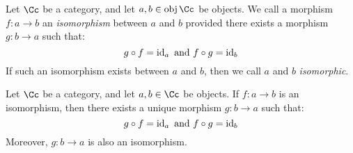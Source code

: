 \begin{definition}
  Let $\Cc$ be a category, and let $a,b \in \obj{\Cc}$ be objects. We
  call a morphism $f:a \xrightarrow{} b$ an \textit{isomorphism}
  between $a$ and $b$ provided there exists a morphism $g:b
  \xrightarrow{} a$ such that:
  \begin{equation*}
    g \circ f=\operatorname{id}_a \text{ and } f \circ g=\operatorname{id}_b
  \end{equation*}
  If such an isomorphism exists between $a$ and $b$, then we call $a$
  and $b$ \textit{isomorphic}.
\end{definition}

\begin{lemma}\label{lemma_1.1.1}
  Let $\Cc$ be a category, and let $a,b \in \Cc$ be objects. If $f:a
  \xrightarrow{} b$ is an isomorphism, then there exists a unique
  morphism $g:b \xrightarrow{} a$ such that:
  \begin{equation*}
    g \circ f=\operatorname{id}_a \text{ and } f \circ g=\operatorname{id}_b
  \end{equation*}
  Moreover, $g:b \xrightarrow{} a$ is also an isomorphism.
\end{lemma}


